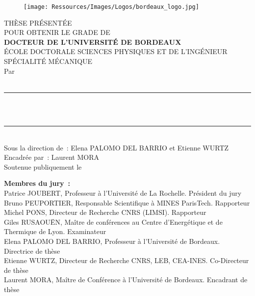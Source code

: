 

\begin{titlepage}
\begin{figure}
    \raggedright
    \texttt{[image: Ressources/Images/Logos/bordeaux\_logo.jpg]}
\end{figure}

\vfill

\begin{center}
    THÈSE PRÉSENTÉE \\
    POUR OBTENIR LE GRADE DE \\[0.8cm]

    \textsc{\Large \textbf{ DOCTEUR DE L'UNIVERSITÉ DE BORDEAUX}}\\[1.5cm] %

    ÉCOLE DOCTORALE SCIENCES PHYSIQUES ET DE L'INGÉNIEUR\\[0.3cm]
    SPÉCIALITÉ MÉCANIQUE\\[1.0cm]
    {\Large Par \myAuthor}\\

    ~\\[0.3cm]
    {\color{SolarizedBrBlue} \rule{\textwidth}{1pt} \vspace{1ex} \filcenter\color{defaultcolor}}
    ~\\[0.01cm]
    {\Large \bfseries \myTitle{}} %
    ~\\[0.2cm]
    {\color{SolarizedBrBlue} \rule{\textwidth}{1pt} \vspace{1ex} \filcenter\color{defaultcolor}}
    ~\\[0.25cm] %

    Sous la direction de~: Elena PALOMO DEL BARRIO et Etienne WURTZ \\
    Encadrée par~: Laurent MORA \\[1.0cm]
    Soutenue publiquement le \myDate
\end{center}

\vfill

\small{
\noindent \textbf{Membres du jury~:} \\ [0.2cm]
\noindent
Patrice JOUBERT, Professeur à l’Université de La Rochelle. \hfill Président du jury\\
Bruno PEUPORTIER, Responsable Scientifique à MINES ParisTech. \hfill Rapporteur\\
Michel PONS, Directeur de Recherche CNRS (LIMSI). \hfill Rapporteur\\
Giles RUSAOUËN, Maître de conférences au Centre d'Energétique et de Thermique de Lyon. \hfill Examinateur\\
Elena PALOMO DEL BARRIO, Professeur à l'Université de Bordeaux. \hfill Directrice de thèse\\
Etienne WURTZ, Directeur de Recherche CNRS, LEB, CEA-INES. \hfill Co-Directeur de thèse\\
Laurent MORA, Maître de Conférence à l’Université de Bordeaux. \hfill Encadrant de thèse\\
}

\end{titlepage}
